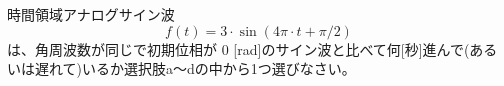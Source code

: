 時間領域アナログサイン波 
\[
f(t) = 3 \cdot \sin( 4\pi \cdot t + \pi/2 )
\]
は、角周波数が同じで初期位相が $0$ [rad]のサイン波と比べて何[秒]進んで(あるいは遅れて)いるか選択肢a〜dの中から1つ選びなさい。

